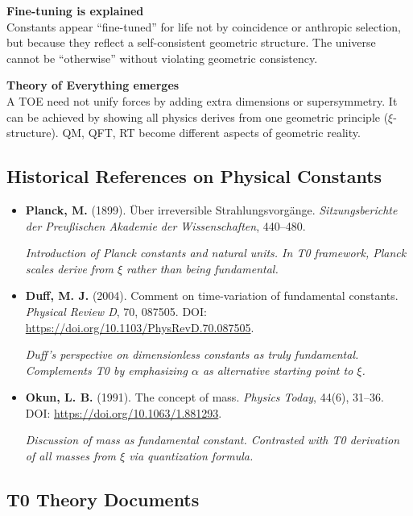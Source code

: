 	\begin{insight}
		\textbf{Fine-tuning is explained}\\
		Constants appear ``fine-tuned'' for life not by coincidence or anthropic selection, but because they reflect a self-consistent geometric structure. The universe cannot be ``otherwise'' without violating geometric consistency.
	\end{insight}
	
	\begin{insight}
		\textbf{Theory of Everything emerges}\\
		A TOE need not unify forces by adding extra dimensions or supersymmetry. It can be achieved by showing all physics derives from one geometric principle ($\xi$-structure). QM, QFT, RT become different aspects of geometric reality.
	\end{insight}
	
	\subsection{Historical References on Physical Constants}
	
	\begin{itemize}
		\item \textbf{Planck, M.} (1899). Über irreversible Strahlungsvorgänge. \textit{Sitzungsberichte der Preußischen Akademie der Wissenschaften}, 440--480. 
		
		\textit{Introduction of Planck constants and natural units. In T0 framework, Planck scales derive from $\xi$ rather than being fundamental.}
		
		\item \textbf{Duff, M. J.} (2004). Comment on time-variation of fundamental constants. \textit{Physical Review D}, 70, 087505. DOI: \url{https://doi.org/10.1103/PhysRevD.70.087505}. 
		
		\textit{Duff's perspective on dimensionless constants as truly fundamental. Complements T0 by emphasizing $\alpha$ as alternative starting point to $\xi$.}
		
		\item \textbf{Okun, L. B.} (1991). The concept of mass. \textit{Physics Today}, 44(6), 31--36. DOI: \url{https://doi.org/10.1063/1.881293}. 
		
		\textit{Discussion of mass as fundamental constant. Contrasted with T0 derivation of all masses from $\xi$ via quantization formula.}
	\end{itemize}
	
	\subsection{T0 Theory Documents}
	
